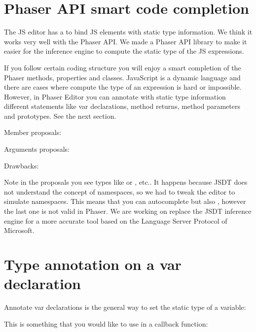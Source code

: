 \documentclass[letterpaper,10pt,english]{sphinxmanual}
\begin{document}
\section{Phaser API smart code completion}
\label{\detokenize{jseditor:phaser-api-smart-code-completion}}
The JS editor has a  to bind JS elements with static type information. We think it works very well with the Phaser API. We made a Phaser API library to make it easier for the inference engine to compute the static type of the JS expressions.

If you follow certain coding structure you will enjoy a smart completion of the Phaser methods, properties and classes. JavaScript is a dynamic language and there are cases where compute the type of an expression is hard or impossible. However, in Phaser Editor you can annotate with static type information different statements like var declarations, method returns, method parameters and prototypes. See the next section.

Member proposals:

\noindent{}

Arguments proposals:

\noindent{}

Drawbacks:

Note in the proposals you see types like  or , etc.. It happens because JSDT does not understand the concept of namespaces, so we had to tweak the editor to simulate namespaces. This means that you can autocomplete  but also , however the last one is not valid in Phaser. We are working on replace the JSDT inference engine for a more accurate tool based on the Language Server Protocol of Microsoft.


\section{Type annotation on a var declaration}
\label{\detokenize{jseditor:type-annotation-on-a-var-declaration}}
Annotate var declarations is the general way to set the static type of a variable:

\noindent{}

This is something that you would like to use in a callback function:

\noindent{}
\end{document}
